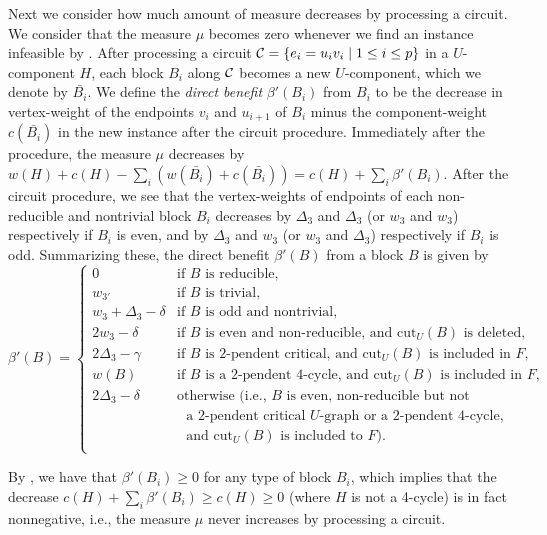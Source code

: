 \documentclass[runningheads]{llncs}
\begin{document}
\bigskip
Next we consider how much amount of measure decreases by processing a circuit.
We consider that the measure  $\mu$ becomes zero whenever
we find an instance infeasible by .
After processing a circuit
${\cal C}=\{e_i=u_iv_i\mid 1\leq i\leq p\}$ in a $U$-component $H$,
each block $B_i$ along ${\cal C}$ becomes a new $U$-component, which we denote by $\bar {B_i}$.
We define the {\em direct benefit} $\beta'(B_i)$ from $B_i$ to
be the decrease in vertex-weight of the endpoints $v_i$ and $u_{i+1}$ of $B_i$
minus the component-weight $c(\bar {B_i})$ in the new instance after the circuit procedure.
Immediately after the procedure, the measure $\mu$ decreases
by $w(H)+c(H)-\sum_i (w(\bar {B_i})+c(\bar {B_i})) =c(H)+\sum_i\beta'(B_i)$.
After the circuit procedure, we see that
the vertex-weights of endpoints of each non-reducible and nontrivial block $B_i$ decreases
by $\Delta_3$ and $\Delta_3$ (or $w_3$ and $w_3$) respectively if  $B_i$ is even,
and
by $\Delta_3$ and $w_3$ (or $w_3$ and $\Delta_3$) respectively if $B_i$ is odd.
Summarizing these, the direct benefit $\beta'(B)$ from a block $B$ is given
by
\begin{equation}\label{beta-1}
 \beta'(B)
=\left\{ \begin{array}{cl}
 0 & \mbox{if  $B$ is reducible},\\
 w_{3'} & \mbox{if  $B$ is trivial},\\
 w_3\!+\!\Delta_3 \!-\!\delta & \mbox{if $B$ is  odd and nontrivial},\\
 \mbox{$2w_3-\delta$}  & \mbox{if $B$ is even and non-reducible, and $\mathrm{cut}_U(B)$ is deleted},\\
 \mbox{$2\Delta_3 -\gamma $}  & \mbox{if $B$ is $2$-pendent critical, and $\mathrm{cut}_U(B)$ is included in $F$},\\
\mbox{$w(B)$} & \mbox{if $B$ is a $2$-pendent 4-cycle, and $\mathrm{cut}_U(B)$ is included in $F$}, \\
\mbox{$2\Delta_3 -\delta$} & \mbox{otherwise (i.e., $B$ is even, non-reducible but not }\\
& \mbox{~ a $2$-pendent critical $U$-graph or a $2$-pendent 4-cycle,} \\
 &\mbox{~  and $\mathrm{cut}_U(B)$ is included to $F$).}\\
\end{array}
\right.\end{equation}

By , we have that $\beta'(B_i)\geq 0$ for any type of block $B_i$, which implies that
the decrease $c(H)+\sum_i \beta'(B_i)\geq c(H)\geq 0$ (where $H$ is not a 4-cycle) is in fact nonnegative,
i.e.,    the measure $\mu$ never increases by processing a circuit.
\end{document}
